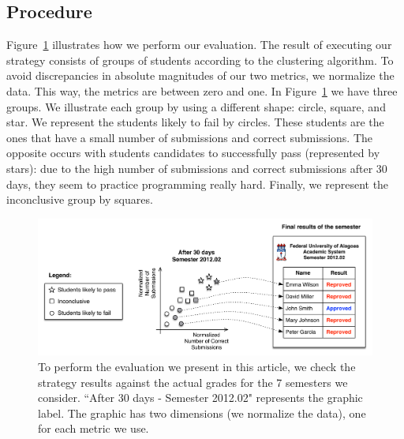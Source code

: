



\subsection{Procedure}

\label{sec:procedure}

Figure~\ref{fig:procedure} illustrates how we perform our evaluation. The result of executing our strategy consists of groups of students according to the clustering algorithm. To avoid discrepancies in absolute magnitudes of our two metrics, we normalize the data. This way, the metrics are between zero and one. In Figure~\ref{fig:procedure} we have three groups. We illustrate each group by using a different shape: circle, square, and star. We represent the students likely to fail by circles. These students are the ones that have a small number of submissions and correct submissions. The opposite occurs with students candidates to successfully pass (represented by stars): due to the high number of submissions and correct submissions after 30 days, they seem to practice programming really hard. Finally, we represent the inconclusive group by squares.

\begin{figure}[htb]
\centering
\includegraphics[width=1.0\textwidth,natwidth=950,natheight=394]{images/Procedure.pdf}
\caption{To perform the evaluation we present in this article, we check the strategy results against the actual grades for the 7 semesters we consider. ``After 30 days - Semester 2012.02" represents the graphic label. The graphic has two dimensions (we normalize the data), one for each metric we use.}
\label{fig:procedure}
\end{figure}

